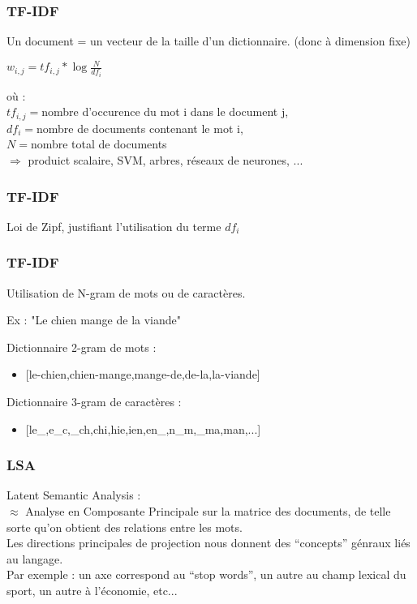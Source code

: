 \begin{frame}
  \frametitle{TF-IDF}
  Un document = un vecteur de la taille d'un dictionnaire. (donc à dimension fixe) \\
  \begin{center}
    $\boxed{w_{i,j} = tf_{i,j}*\log{\frac{N}{df_i}}}$
  \end{center}
  où : \\
  $tf_{i,j} = $nombre d'occurence du mot i dans le document j, \\
  $df_i = $nombre de documents contenant le mot i, \\
  $N = $nombre total de documents \\
  \newline
  $\Rightarrow$ produict scalaire, SVM, arbres, réseaux de neurones, ...
\end{frame}

\begin{frame}
  \frametitle{TF-IDF}
  Loi de Zipf, justifiant l'utilisation du terme $df_i$
\end{frame}

\begin{frame}
  \frametitle{TF-IDF}
  Utilisation de N-gram de mots ou de caractères.
  \begin{center}
  Ex : "Le chien mange de la viande"
  \end{center}
  $ $\\
  Dictionnaire 2-gram de mots : 
  \begin{itemize}
  \item {[le-chien,chien-mange,mange-de,de-la,la-viande]}
  \end{itemize}
  Dictionnaire 3-gram de caractères :
  \begin{itemize}
  \item {[le\_,e\_c,\_ch,chi,hie,ien,en\_,n\_m,\_ma,man,...]}
  \end{itemize}
\end{frame}

\begin{frame}
  \frametitle{LSA}
  Latent Semantic Analysis : \\
  \newline
  $\approx$ Analyse en Composante Principale sur la matrice des documents, de telle sorte qu'on obtient des relations entre les mots. \\
  Les directions principales de projection nous donnent des ``concepts'' génraux liés au langage. \\
  \newline
  Par exemple : un axe correspond au ``stop words'', un autre au champ lexical du sport, un autre à l'économie, etc...  
\end{frame}

